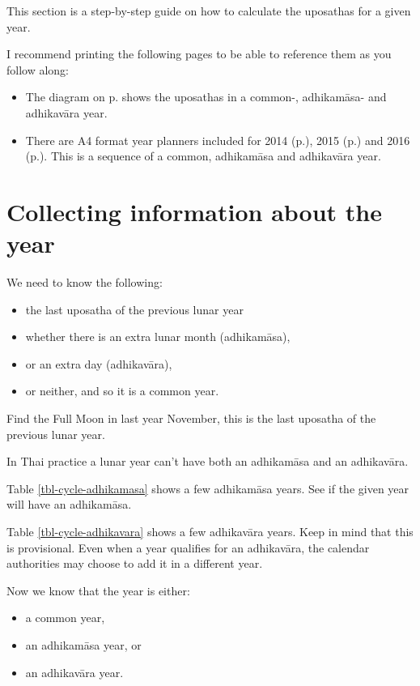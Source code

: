 \documentclass[11pt,oneside]{memoir-article}
\begin{document}
This section is a step-by-step guide on how to calculate the uposathas for a
given year.

I recommend printing the following pages to be able to reference them as you follow along:

\begin{itemize}
\item The diagram on p.\pageref{dia-common-adhikamasa-adhikavara} shows the
uposathas in a common-, adhikamāsa- and adhikavāra year.
\item There are A4 format year planners included for 2014 (p.\pageref{year-2014}),
2015 (p.\pageref{year-2015}) and 2016 (p.\pageref{year-2016}). This is a
sequence of a common, adhikamāsa and adhikavāra year.
\end{itemize}

\section{Collecting information about the year}
\label{sec-1-1}

We need to know the following:

\begin{itemize}
\item the last uposatha of the previous lunar year
\item whether there is an extra lunar month (adhikamāsa),
\item or an extra day (adhikavāra),
\item or neither, and so it is a common year.
\end{itemize}

Find the Full Moon in last year November, this is the last uposatha of the
previous lunar year.

In Thai practice a lunar year can't have both an adhikamāsa and an adhikavāra.

Table \ref{tbl-cycle-adhikamasa} shows a few adhikamāsa years. See if the given
year will have an adhikamāsa.

Table \ref{tbl-cycle-adhikavara} shows a few adhikavāra years. Keep in mind that
this is provisional. Even when a year qualifies for an adhikavāra, the calendar
authorities may choose to add it in a different year.

Now we know that the year is either:

\begin{itemize}
\item a common year,
\item an adhikamāsa year, or
\item an adhikavāra year.
\end{itemize}
\end{document}
